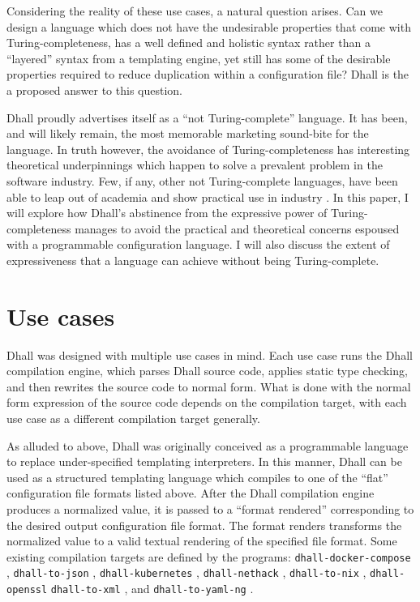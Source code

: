 \documentclass[12pt]{diazessay}
\begin{document}
Considering the reality of these use cases, a natural question arises.
Can we design a language which does not have the undesirable properties that come with Turing-completeness, has a well defined and holistic syntax rather than a ``layered'' syntax from a templating engine, yet still has some of the desirable properties required to reduce duplication within a configuration file? Dhall is the a proposed answer to this question.

Dhall proudly advertises itself as a ``not Turing-complete'' language.
It has been, and will likely remain, the most memorable marketing sound-bite for the language.
In truth however, the avoidance of Turing-completeness has interesting theoretical underpinnings which happen to solve a prevalent problem in the software industry.
Few, if any, other not Turing-complete languages, have been able to leap out of academia and show practical use in industry \cite{CoFu92,hammond2003hume, mcbride2004epigram}.
In this paper, I will explore how Dhall's abstinence from the expressive power of Turing-completeness manages to avoid the practical and theoretical concerns espoused with a programmable configuration language.
I will also discuss the extent of expressiveness that a language can achieve without being Turing-complete.

\section*{Use cases}

Dhall was designed with multiple use cases in mind.
Each use case runs the Dhall compilation engine, which parses Dhall source code, applies static type checking, and then rewrites the source code to normal form.
What is done with the normal form expression of the source code depends on the compilation target, with each use case as a different compilation target generally.

As alluded to above, Dhall was originally conceived as a programmable language to replace under-specified templating interpreters.
In this manner, Dhall can be used as a structured templating language which compiles to one of the ``flat'' configuration file formats listed above.
After the Dhall compilation engine produces a normalized value, it is passed to a ``format rendered'' corresponding to the desired output configuration file format.
The format renders transforms the normalized value to a valid textual rendering of the specified file format.
Some existing compilation targets are defined by the programs: \texttt{dhall-docker-compose} \cite{DhallDocker}, \texttt{dhall-to-json} \cite{DhallJSON}, \texttt{dhall-kubernetes} \cite{DhallKubernetes}, \texttt{dhall-nethack} \cite{DhallNethack}, \texttt{dhall-to-nix} \cite{DhallNix}, \texttt{dhall-openssl} \cite{DhallOpenSSL} \texttt{dhall-to-xml} \cite{DhallXML}, and \texttt{dhall-to-yaml-ng} \cite{DhallYAML}.
\end{document}
